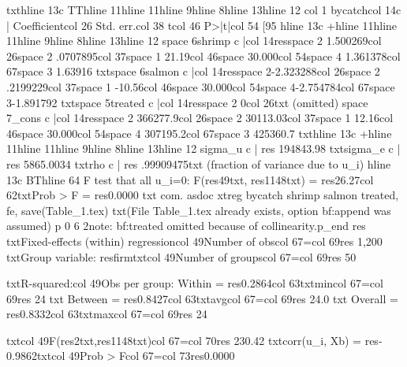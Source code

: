 {txt}{hline 13}{c TT}{hline 11}{hline 11}{hline 9}{hline 8}{hline 13}{hline 12}
{col 1}     bycatch{col 14}{c |} Coefficient{col 26}  Std. err.{col 38}      t{col 46}   P>|t|{col 54}     [95%
{hline 13}{c +}{hline 11}{hline 11}{hline 9}{hline 8}{hline 13}{hline 12}
{space 6}shrimp {c |}{col 14}{res}{space 2} 1.500269{col 26}{space 2} .0707895{col 37}{space 1}   21.19{col 46}{space 3}0.000{col 54}{space 4} 1.361378{col 67}{space 3}  1.63916
{txt}{space 6}salmon {c |}{col 14}{res}{space 2}-2.323288{col 26}{space 2} .2199229{col 37}{space 1}  -10.56{col 46}{space 3}0.000{col 54}{space 4}-2.754784{col 67}{space 3}-1.891792
{txt}{space 5}treated {c |}{col 14}{res}{space 2}        0{col 26}{txt}  (omitted)
{space 7}_cons {c |}{col 14}{res}{space 2} 366277.9{col 26}{space 2} 30113.03{col 37}{space 1}   12.16{col 46}{space 3}0.000{col 54}{space 4} 307195.2{col 67}{space 3} 425360.7
{txt}{hline 13}{c +}{hline 11}{hline 11}{hline 9}{hline 8}{hline 13}{hline 12}
     sigma_u {c |} {res} 194843.98
     {txt}sigma_e {c |} {res} 5865.0034
         {txt}rho {c |} {res} .99909475{txt}   (fraction of variance due to u_i)
{hline 13}{c BT}{hline 64}
F test that all u_i=0: F({res}49{txt}, {res}1148{txt}) = {res}26.27{col 62}{txt}Prob > F = {res}0.0000
{txt}
{com}. asdoc xtreg bycatch shrimp salmon treated, fe, save(Table_1.tex)
{txt}(File Table_1.tex already exists, option {bf:append} was assumed)
{p 0 6 2}note: {bf:treated} omitted because of collinearity.{p_end}
{res}
{txt}Fixed-effects (within) regression{col 49}Number of obs{col 67}={col 69}{res}     1,200
{txt}Group variable: {res}firm{txt}{col 49}Number of groups{col 67}={col 69}{res}        50

{txt}R-squared:{col 49}Obs per group:
     Within  = {res}0.2864{col 63}{txt}min{col 67}={col 69}{res}        24
{txt}     Between = {res}0.8427{col 63}{txt}avg{col 67}={col 69}{res}      24.0
{txt}     Overall = {res}0.8332{col 63}{txt}max{col 67}={col 69}{res}        24

{txt}{col 49}F({res}2{txt},{res}1148{txt}){col 67}={col 70}{res}   230.42
{txt}corr(u_i, Xb) = {res}-0.9862{txt}{col 49}Prob > F{col 67}={col 73}{res}0.0000

